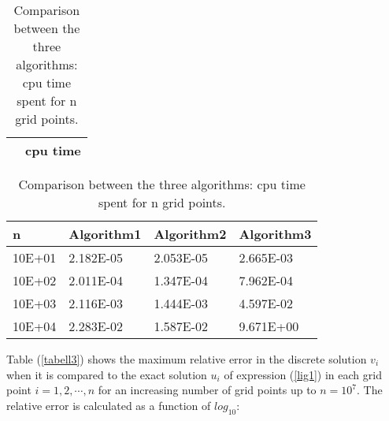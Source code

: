 \documentclass[11pt]{article}
\begin{document}
\begin{table}[H]
\begin{center}
\begin{tabular}{|p{25mm}|p{83.5mm}|}
\hline
 &\hspace{30 mm}  cpu time \\ \hline
\end{tabular}
\begin{tabular}{|p{25mm}|p{25mm}|p{25mm}|p{25mm}|}
\hspace{8mm} n  & Algorithm1 & Algorithm2& Algorithm3\\ \hline 
\hspace{4mm} 10E+01 & 2.182E-05 & 2.053E-05 & 2.665E-03   \\ \hline
\hspace{4mm} 10E+02 & 2.011E-04 & 1.347E-04 & 7.962E-04   \\ \hline
\hspace{4mm} 10E+03 & 2.116E-03 & 1.444E-03 & 4.597E-02   \\ \hline
\hspace{4mm} 10E+04 & 2.283E-02 & 1.587E-02 & 9.671E+00  \\ \hline
\end{tabular}
\end{center}
\caption{Comparison between the three algorithms: cpu time spent for n grid points.}
\label{tabell2}
\end{table} 

\noindent
Table (\ref{tabell3}) shows the maximum relative error in the discrete solution $v_i$ when it
is compared to the exact solution $u_i$ of expression (\ref{lig1}) in each grid point $i= 1, 2, \cdots, n$
for an increasing number of grid points up to $n=10^7$. 
The relative error is calculated as a function of $log_{10}$: 
\end{document}
